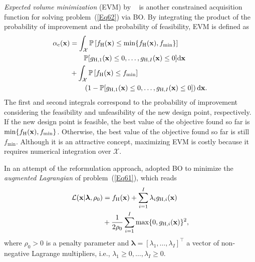 \documentclass[iicol,sn-basic]{sn-jnl}%
\begin{document}
\textit{Expected volume minimization} (EVM) by ~\cite{Picheny2014} is another constrained acquisition function for solving problem~(\ref{Eq62}) via BO.
By integrating the product of the probability of improvement and the probability of feasibility, EVM is defined as
\begin{equation}\label{Eq65}          
	\begin{aligned}
		\alpha_\text{c}({\bf x}) & = \int_{\mathcal{X}} \mathbb{P}\left[f_\text{H}({\bf x}) \leq \min\{f_\text{H}({\bf x}),f_{\min}\}\right]\\ 
		& \qquad \mathbb{P}[g_{\text{H},1}({\bf x}) \leq 0,\dots,g_{\text{H},I}({\bf x}) \leq 0] \text{d}{\bf x}  \\
		& + \int_{\mathcal{X}} \mathbb{P}\left[f_\text{H}({\bf x}) \leq f_{\min}\right]\\
		& \qquad \left(1-\mathbb{P}[g_{\text{H},1}({\bf x}) \leq 0,\dots,g_{\text{H},I}({\bf x}) \leq 0]\right) \text{d}{\bf x}.
	\end{aligned} 
\end{equation}
The first and second integrals correspond to the probability of improvement considering the feasibility and unfeasibility of the new design point, respectively.
If the new design point is feasible, the best value of the objective found so far is $\min\{f_\text{H}({\bf x}),f_{\min}\}$.
Otherwise, the best value of the objective found so far is still $f_{\min}$.
Although it is an attractive concept, maximizing EVM is costly because it requires numerical integration over $\mathcal{X}$.

In an attempt of the reformulation approach, \cite{Gramacy2016} adopted BO to minimize the \textit{augmented Lagrangian} of problem~(\ref{Eq61}), which reads
\begin{equation}\label{Eq66}
	\begin{aligned}
		\mathcal{L}({\bf x}|\boldsymbol{\lambda},\rho_0) & = f_\text{H}({\bf x}) + \sum_{i=1}^{I} \lambda_i g_{\text{H},i}({\bf x}) \\
		& + \frac{1}{2 \rho_0} \sum_{i=1}^{I} \max\{0,g_{\text{H},i}({\bf x})\}^2, 
	\end{aligned} 
\end{equation}
where  $\rho_0>0$ is a penalty parameter and $\boldsymbol{\lambda}=[\lambda_1,\dots,\lambda_I]^\intercal$ a vector of non-negative Lagrange multipliers, i.e., $\lambda_1 \geq 0,\dots,\lambda_I \geq 0$.
\end{document}
